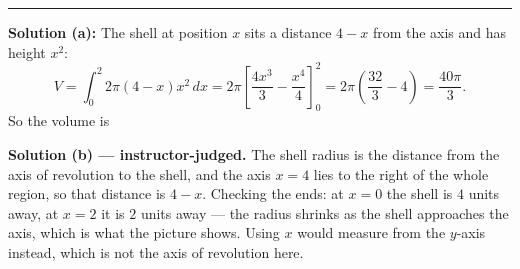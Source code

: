 \documentclass[12pt]{article}
\begin{document}
\vspace{0.2cm}\noindent\rule{\linewidth}{0.2pt}\vspace{0.2cm}


\textbf{Solution (a):} The shell at position $x$ sits a distance $4 - x$ from the axis and has height $x^2$:
\[ V = \int_0^2 2\pi(4 - x)x^2\,dx = 2\pi\left[\frac{4x^3}{3} - \frac{x^4}{4}\right]_0^2 = 2\pi\left(\frac{32}{3} - 4\right) = \frac{40\pi}{3}. \]
So the volume is 

\textbf{Solution (b) --- instructor-judged.} The shell radius is the distance from the axis of revolution to the shell, and the axis $x = 4$ lies to the right of the whole region, so that distance is $4 - x$. Checking the ends: at $x = 0$ the shell is $4$ units away, at $x = 2$ it is $2$ units away --- the radius shrinks as the shell approaches the axis, which is what the picture shows. Using $x$ would measure from the $y$-axis instead, which is not the axis of revolution here.
\end{document}
